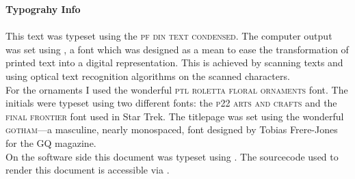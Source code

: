 {
\parindent0mm
\raggedbottom

\fancyfoot{}

\textbf{Typograhy Info}\\ \ \\

This text was typeset using the \textsc{pf din text condensed}. 
The computer output was set using , a font which was designed
as a mean to ease the transformation of printed text into a digital 
representation. This is achieved by scanning texts and using optical 
text recognition algorithms on the scanned characters.\\

For the ornaments I used the wonderful \textsc{ptl roletta floral ornaments}
font. The initials were typeset using two different fonts:  
the \textsc{p22 arts and crafts} and the \textsc{final frontier} font used
in Star Trek.
The titlepage was set using the wonderful \textsc{gotham}---a masculine,
nearly monospaced, font designed by Tobias Frere-Jones for the GQ magazine.\\

On the software side this document was typeset using \engine.
The sourcecode used to render this document is accessible via
. 





\pagebreak


}

